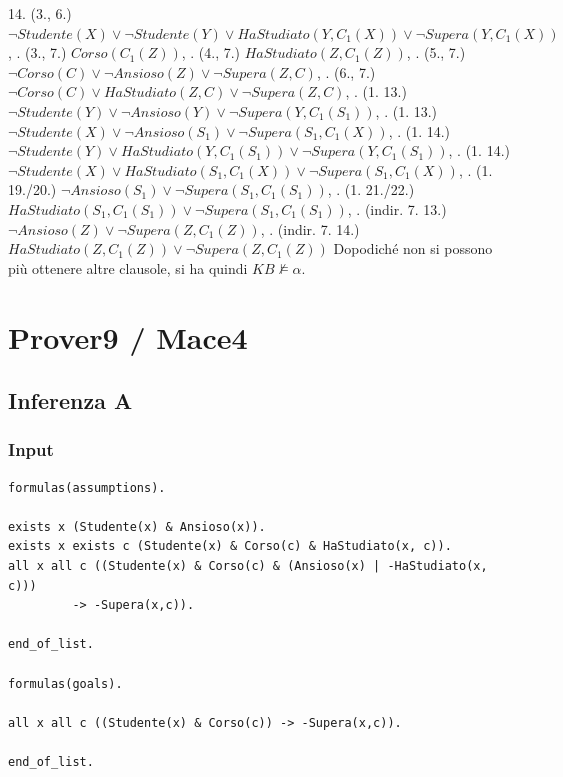 \documentclass[a4paper, 12pt]{article}
\begin{document}
14. (3., 6.)\;\; $ \lnot Studente(X) \lor \lnot Studente(Y) \lor HaStudiato(Y, C_1(X)) \lor \lnot Supera(Y, C_1(X))$, . (3., 7.)\;\; $ Corso(C_1(Z)) $, . (4., 7.)\;\; $ HaStudiato(Z, C_1(Z)) $, . (5., 7.)\;\; $ \lnot Corso(C) \lor \lnot Ansioso(Z) \lor \lnot Supera(Z, C) $, . (6., 7.)\;\; $ \lnot Corso(C) \lor HaStudiato(Z, C) \lor \lnot Supera(Z, C) $, . (1. 13.)\;\; $ \lnot Studente(Y) \lor \lnot Ansioso(Y) \lor \lnot Supera(Y, C_1(S_1)) $, . (1. 13.)\;\; $ \lnot Studente(X) \lor \lnot Ansioso(S_1) \lor \lnot Supera(S_1, C_1(X)) $, . (1. 14.)\;\; $ \lnot Studente(Y) \lor HaStudiato(Y, C_1(S_1)) \lor \lnot Supera(Y, C_1(S_1)) $, . (1. 14.)\;\; $ \lnot Studente(X) \lor HaStudiato(S_1, C_1(X)) \lor \lnot Supera(S_1, C_1(X)) $, . (1. 19./20.)\;\; $ \lnot Ansioso(S_1) \lor \lnot Supera(S_1, C_1(S_1)) $, . (1. 21./22.)\;\; $  HaStudiato(S_1, C_1(S_1)) \lor \lnot Supera(S_1, C_1(S_1)) $, . (indir. 7. 13.)\;\; $ \lnot Ansioso(Z) \lor \lnot Supera(Z, C_1(Z)) $, . (indir. 7. 14.)\;\; $  HaStudiato(Z, C_1(Z)) \lor \lnot Supera(Z, C_1(Z)) $ \newline
\newline
Dopodiché non si possono più ottenere altre clausole, si ha quindi $KB \not \models \alpha$.
\section{Prover9 / Mace4}
\subsection{Inferenza A}
\subsubsection{Input}
\begin{verbatim}
formulas(assumptions).

exists x (Studente(x) & Ansioso(x)).
exists x exists c (Studente(x) & Corso(c) & HaStudiato(x, c)).
all x all c ((Studente(x) & Corso(c) & (Ansioso(x) | -HaStudiato(x, c)))
         -> -Supera(x,c)).

end_of_list.

formulas(goals).

all x all c ((Studente(x) & Corso(c)) -> -Supera(x,c)).

end_of_list.
\end{verbatim}
\end{document}
